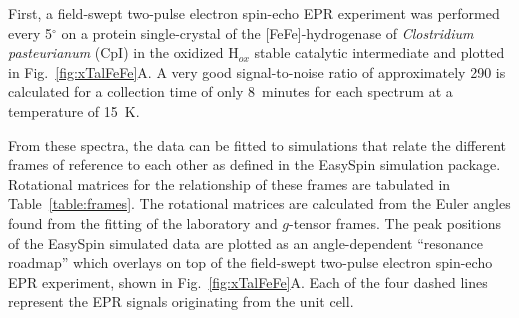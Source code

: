 First, a field-swept two-pulse electron spin-echo EPR experiment was performed every 5$^{\circ}$ on a protein single-crystal of the [FeFe]-hydrogenase of \textit{Clostridium pasteurianum} (CpI) in the oxidized H$_{ox}$ stable catalytic intermediate and plotted in Fig.~\ref{fig:xTalFeFe}A. A very good signal-to-noise ratio of approximately 290 is calculated for a collection time of only 8~minutes for each spectrum at a temperature of 15~K. 

From these spectra, the data can be fitted to simulations that relate the different frames of reference to each other as defined in the EasySpin simulation package. Rotational matrices for the relationship of these frames are tabulated in Table~\ref{table:frames}. The rotational matrices are calculated from the Euler angles found from the fitting of the laboratory and $g$-tensor frames. The peak positions of the EasySpin simulated data are plotted as an angle-dependent ``resonance roadmap'' which overlays on top of the field-swept two-pulse electron spin-echo EPR experiment, shown in Fig.~\ref{fig:xTalFeFe}A. Each of the four dashed lines represent the EPR signals originating from the unit cell.

